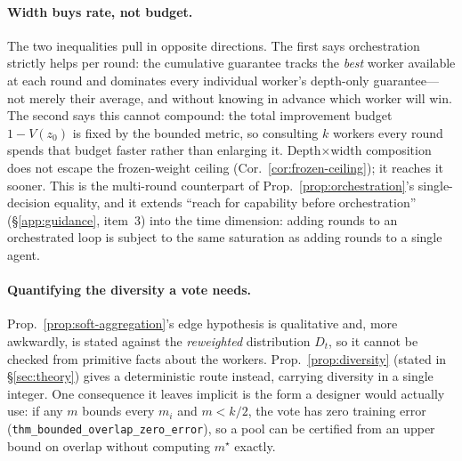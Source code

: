 \paragraph{Width buys rate, not budget.} The two inequalities pull in opposite directions. The first says orchestration strictly helps per round: the cumulative guarantee tracks the \emph{best} worker available at each round and dominates every individual worker's depth-only guarantee---not merely their average, and without knowing in advance which worker will win. The second says this cannot compound: the total improvement budget $1-V(z_0)$ is fixed by the bounded metric, so consulting $k$ workers every round spends that budget faster rather than enlarging it. Depth$\times$width composition does not escape the frozen-weight ceiling (Cor.~\ref{cor:frozen-ceiling}); it reaches it sooner. This is the multi-round counterpart of Prop.~\ref{prop:orchestration}'s single-decision equality, and it extends ``reach for capability before orchestration'' (\S\ref{app:guidance}, item~3) into the time dimension: adding rounds to an orchestrated loop is subject to the same saturation as adding rounds to a single agent.

\paragraph{Quantifying the diversity a vote needs.} Prop.~\ref{prop:soft-aggregation}'s edge hypothesis is qualitative and, more awkwardly, is stated against the \emph{reweighted} distribution $D_t$, so it cannot be checked from primitive facts about the workers. Prop.~\ref{prop:diversity} (stated in \S\ref{sec:theory}) gives a deterministic route instead, carrying diversity in a single integer. One consequence it leaves implicit is the form a designer would actually use: if any $m$ bounds every $m_i$ and $m{<}k/2$, the vote has zero training error (\texttt{thm\_bounded\_overlap\_zero\_error}), so a pool can be certified from an upper bound on overlap without computing $m^\star$ exactly.

